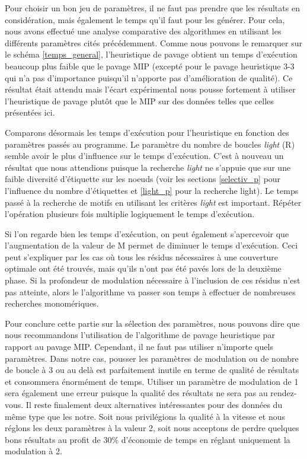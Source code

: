 Pour choisir un bon jeu de paramètres, il ne faut pas prendre que les résultats en considération, mais également le temps qu'il faut pour les générer.
Pour cela, nous avons effectué une analyse comparative des algorithmes en utilisant les différents paramètres cités précédemment.
Comme nous pouvons le remarquer sur le schéma \ref{temps_general}, l'heuristique de pavage obtient un temps d'exécution beaucoup plus faible que le pavage MIP (excepté pour le pavage heuristique 3-3 qui n'a pas d'importance puisqu'il n'apporte pas d'amélioration de qualité).
Ce résultat était attendu mais l'écart expérimental nous pousse fortement à utiliser l'heuristique de pavage plutôt que le MIP sur des données telles que celles présentées ici.

Comparons désormais les temps d'exécution pour l'heuristique en fonction des paramètres passés au programme.
Le paramètre du nombre de boucles \textit{light} (R) semble avoir le plus d'influence sur le temps d'exécution.
C'est à nouveau un résultat que nous attendions puisque la recherche \textit{light} ne s'appuie que sur une faible diversité d'étiquette sur les noeuds (voir les sections \ref{selectiv_p} pour l'influence du nombre d'étiquettes et \ref{light_p} pour la recherche light).
Le temps passé à la recherche de motifs en utilisant les critères \textit{light} est important.
Répéter l'opération plusieurs fois multiplie logiquement le temps d'exécution.

Si l'on regarde bien les temps d'exécution, on peut également s'apercevoir que l'augmentation de la valeur de M permet de diminuer le temps d'exécution.
Ceci peut s'expliquer par les cas où tous les résidus nécessaires à une couverture optimale ont été trouvés, mais qu'ils n'ont pas été pavés lors de la deuxième phase.
Si la profondeur de modulation nécessaire à l'inclusion de ces résidus n'est pas atteinte, alors le l'algorithme va passer son temps à effectuer de nombreuses recherches monomériques.

Pour conclure cette partie  sur la sélection des paramètres, nous pouvons dire que nous recommandons l'utilisation de l'algorithme de pavage heuristique par rapport au pavage MIP.
Cependant, il ne faut pas utiliser n'importe quels paramètres.
Dans notre cas, pousser les paramètres de modulation ou de nombre de boucle à 3 ou au delà est parfaitement inutile en terme de qualité de résultats et consommera énormément de temps.
Utiliser un paramètre de modulation de 1 sera également une erreur puisque la qualité des résultats ne sera pas au rendez-vous.
Il reste finalement deux alternatives intéressantes pour des données du même type que les notre.
Soit nous privilégions la qualité à la vitesse et nous réglons les deux paramètres à la valeur 2, soit nous acceptons de perdre quelques bons résultats au profit de 30\% d'économie de temps en réglant uniquement la modulation à 2.





